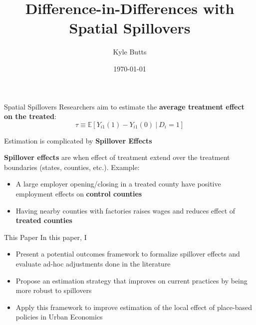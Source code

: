 \documentclass[aspectratio=169]{beamer}
\title{Difference-in-Differences with Spatial Spillovers}
\date{\today}
\author{Kyle Butts}
\begin{document}
\maketitle

\begin{frame}{Spatial Spillovers}
    Researchers aim to estimate the \textbf{average treatment effect on the treated}: 
    \[
        \tau \equiv \mathbb{E} \left[ Y_{i1}(1) - Y_{i1}(0) \ \vert \ D_{i} = 1 \right]
    \]
    
    Estimation is complicated by \textbf{Spillover Effects}
    
    \vspace{5mm}
    \textbf{Spillover effects} are when effect of treatment extend over the treatment boundaries (states, counties, etc.). Example:
    
    \begin{itemize}
        \item A large employer opening/closing in a treated county have positive employment effects on \textbf{control counties}
        
        \item Having nearby counties with factories raises wages and reduces effect of \textbf{treated counties}
    \end{itemize}
\end{frame}

\begin{frame}{This Paper}
    In this paper, I

    \begin{itemize}
        \item Present a potential outcomes framework to formalize spillover effects and evaluate ad-hoc adjustments done in the literature
        
        \item Propose an estimation strategy that improves on current practices by being more robust to spillovers
        
        \item Apply this framework to improve estimation of the local effect of place-based policies in Urban Economics 
    \end{itemize}

\end{frame}
\end{document}
